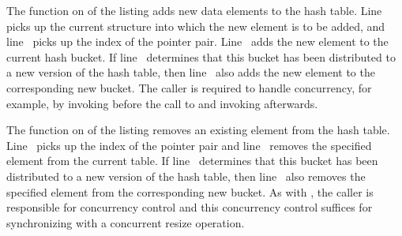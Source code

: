 \begin{fcvref}
The  function on  of the listing adds
new data elements to the hash table.
Line~ picks up the current  structure into which the
new element is to be added, and line~ picks up the index of
the pointer pair.
Line~ adds the new element to the current hash bucket.
If line~ determines that this bucket has been distributed
to a new version of the hash table, then line~ also adds the
new element to the corresponding new bucket.
The caller is required to handle concurrency, for example, by invoking
 before the call to  and invoking
 afterwards.
\end{fcvref}

\begin{fcvref}
The  function on
 of the listing removes
an existing element from the hash table.
Line~ picks up the index of the pointer pair
and line~ removes the specified element from the current table.
If line~ determines that this bucket has been distributed
to a new version of the hash table, then line~ also removes
the specified element from the corresponding new bucket.
As with , the caller is responsible for concurrency
control and this concurrency control suffices for synchronizing with
a concurrent resize operation.
\end{fcvref}

